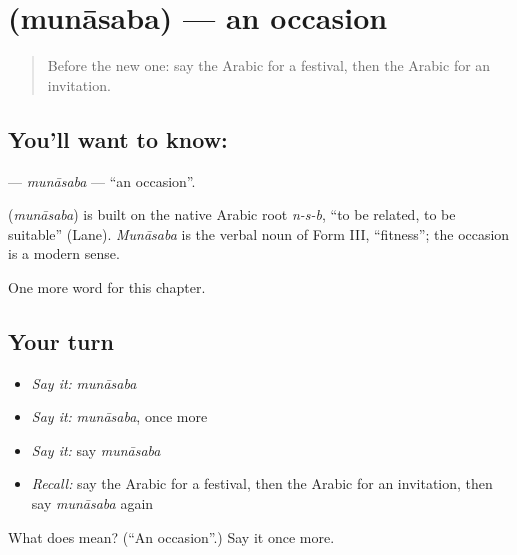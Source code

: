 \section[\texorpdfstring{\ar{مناسبة} (munāsaba)}{مناسبة (munāsaba)}]{ (munāsaba) — an occasion}

\label{lesson:AR-C184-munasaba}



\begin{quote}
Before the new one: say the Arabic for a festival, then the Arabic for an invitation.
\end{quote}

\subsection*{You'll want to know: }
\textbf{} — \emph{munāsaba} — \textquotedblleft{}an occasion\textquotedblright{}.

\begin{cousinweb}
\textbf{} (\emph{munāsaba}) is built on the native Arabic root \emph{n-s-b}, \textquotedblleft{}to be related, to be suitable\textquotedblright{} (Lane). \emph{Munāsaba} is the verbal noun of Form III, \textquotedblleft{}fitness\textquotedblright{}; the occasion is a modern sense.
\end{cousinweb}

\begin{grammarlens}[title={What you've built}]
One more word for this chapter.
\end{grammarlens}

\subsection*{Your turn}
\begin{itemize}
\raggedright
  \item \emph{Say it:} \emph{munāsaba}
  \item \emph{Say it:} \emph{munāsaba}, once more
  \item \emph{Say it:} say \emph{munāsaba}
  \item \emph{Recall:} say the Arabic for a festival, then the Arabic for an invitation, then say \emph{munāsaba} again
\end{itemize}

\begin{tcolorbox}[breakable,colback=teal!4,colframe=teal!35!black,title={Before you move on}]
What does  mean? (\textquotedblleft{}An occasion\textquotedblright{}.) Say it once more.
\end{tcolorbox}
